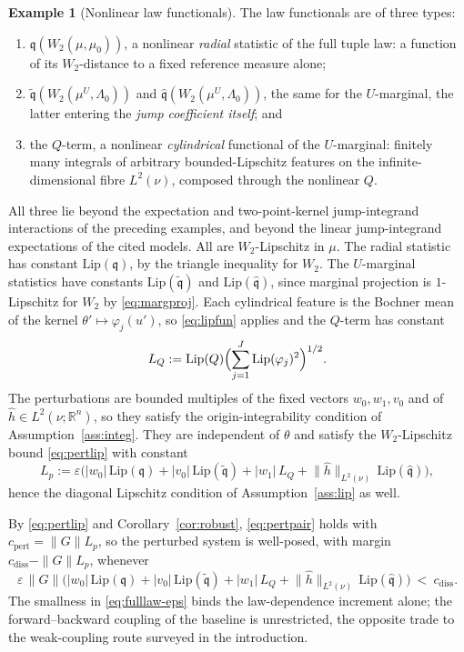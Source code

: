 \documentclass[preprint,12pt]{elsarticle}
\newcommand{\R}{\mathbb{R}}
\newcommand{\Lnu}{L^2(\nu)}
\newcommand{\Lnorm}[1]{\lVert #1\rVert_{\Lnu}}
\numberwithin{equation}{section}
\theoremstyle{plain}
\theoremstyle{definition}
\theoremstyle{\PaperRemarkStyle}
\newtheorem{example}[theorem]{Example}
\begin{document}
\begin{example}[Nonlinear law functionals]
The law functionals are of three types:
\begin{enumerate}[label=(\roman*)]
\item $\mathfrak q(W_2(\mu,\mu_0))$, a nonlinear \emph{radial} statistic of the full tuple law:
  a function of its $W_2$-distance to a fixed reference measure alone;
\item $\tilde{\mathfrak q}(W_2(\mu^U,\Lambda_0))$ and $\hat{\mathfrak q}(W_2(\mu^U,\Lambda_0))$, the same for the
  $U$-marginal, the latter entering the \emph{jump coefficient itself}; and
\item the $Q$-term, a nonlinear \emph{cylindrical} functional of the $U$-marginal: finitely
  many integrals of arbitrary bounded-Lipschitz features on the infinite-dimensional fibre
  $\Lnu$, composed through the nonlinear $Q$.
\end{enumerate}
All three lie beyond the expectation and two-point-kernel jump-integrand interactions of the
preceding examples, and beyond the linear jump-integrand expectations of the cited models. All
are $W_2$-Lipschitz in $\mu$. The radial statistic has constant $\mathrm{Lip}(\mathfrak q)$, by the
triangle inequality for $W_2$. The $U$-marginal statistics have constants
$\mathrm{Lip}(\tilde{\mathfrak q})$ and $\mathrm{Lip}(\hat{\mathfrak q})$, since marginal projection is
$1$-Lipschitz for $W_2$ by \eqref{eq:margproj}. Each cylindrical feature is the Bochner mean of
the kernel $\theta'\mapsto\varphi_j(u')$, so \eqref{eq:lipfun} applies and the $Q$-term has
constant
\[
L_Q:=\mathrm{Lip}(Q)\Bigl(\sum_{j=1}^J\mathrm{Lip}(\varphi_j)^2\Bigr)^{1/2} .
\]
The perturbations are bounded multiples of the fixed vectors $w_0,w_1,v_0$ and of
$\hat h\in L^2(\nu;\R^n)$, so they satisfy the origin-integrability condition of
Assumption~\ref{ass:integ}.
They are independent of $\theta$ and satisfy the $W_2$-Lipschitz bound \eqref{eq:pertlip}
with constant
\[
L_p:=\varepsilon\bigl(|w_0|\,\mathrm{Lip}(\mathfrak q)+|v_0|\,\mathrm{Lip}(\tilde{\mathfrak q})+|w_1|\,L_Q
+\Lnorm{\hat h}\,\mathrm{Lip}(\hat{\mathfrak q})\bigr) ,
\]
hence the diagonal Lipschitz condition of Assumption~\ref{ass:lip} as well.

By \eqref{eq:pertlip} and Corollary~\ref{cor:robust}, \eqref{eq:pertpair} holds with
$c_{\mathrm{pert}}=\|G\|L_p$, so the perturbed system is well-posed, with margin
$c_{\mathrm{diss}}-\|G\|L_p$, whenever
\begin{equation}\label{eq:fulllaw-eps}
\varepsilon\,\|G\|\bigl(|w_0|\,\mathrm{Lip}(\mathfrak q)+|v_0|\,\mathrm{Lip}(\tilde{\mathfrak q})+|w_1|\,L_Q
+\Lnorm{\hat h}\,\mathrm{Lip}(\hat{\mathfrak q})\bigr)\ <\ c_{\mathrm{diss}} .
\end{equation}
The smallness in \eqref{eq:fulllaw-eps} binds the law-dependence increment alone; the
forward--backward coupling of the baseline is unrestricted, the opposite trade to the
weak-coupling route surveyed in the introduction.
\end{example}
\end{document}
